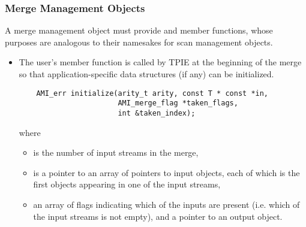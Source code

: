 \subsubsection{Merge Management Objects}


A merge management object must provide 
and  member functions, whose purposes are
analogous to their namesakes for scan management objects.

\begin{itemize}
    
    \item {}
    The user's  member function is
    called by TPIE at the beginning of the merge so that
    application-specific data structures (if any) can be
    initialized.
\begin{verbatim}
    AMI_err initialize(arity_t arity, const T * const *in,
                       AMI_merge_flag *taken_flags,
                       int &taken_index);
\end{verbatim}
 
    where
    \begin{itemize}
        \item {} is the number of input streams
        in the merge,
        \item {} is a pointer to an array of
        pointers to input objects, each of which is the
        first objects appearing in one of the input streams,    
        \item {} an array of flags
        indicating which of the inputs are present (i.e.
        which of the input streams is not empty), and a
        pointer to an output object.
    \end{itemize}
    

\end{itemize}
